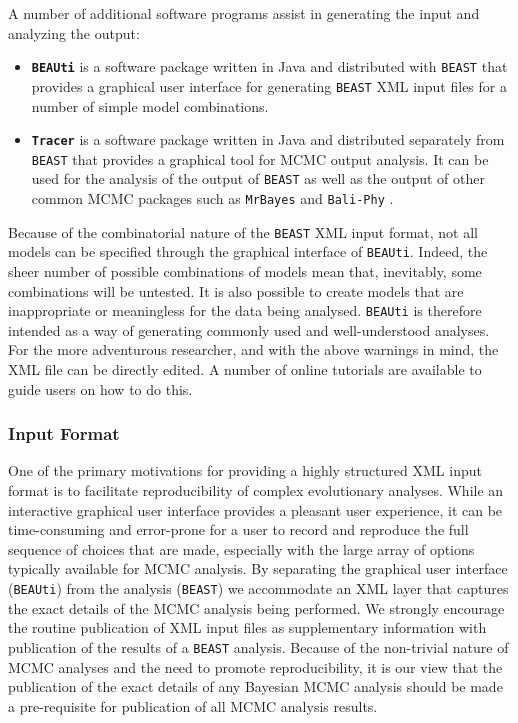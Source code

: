 \documentclass[cup7b, english]{cupbook}
\begin{document}
A number of additional software programs assist in generating the
input and analyzing the output:

\begin{itemize}
\item \textbf{\texttt{BEAUti}} is a software package written in Java and
distributed with \texttt{BEAST} that provides a graphical user interface for
generating \texttt{BEAST} XML input files for a number of simple model combinations.
\item \textbf{\texttt{Tracer}} is a software package written in Java and
distributed separately from \texttt{BEAST} that provides a graphical tool for
MCMC output analysis. It can be used for the analysis of the output
of \texttt{BEAST} as well as the output of other common MCMC packages such
as \texttt{MrBayes} \cite{HR2001} and \texttt{Bali-Phy} \cite{SR2006}.
\end{itemize}
Because of the combinatorial nature of the \texttt{BEAST} XML input format,
not all models can be specified through the graphical interface of
\texttt{BEAUti}. Indeed, the sheer number of possible combinations
of models mean that, inevitably, some combinations will
be untested. It is also possible to create models that
are inappropriate or meaningless for the data being analysed. \texttt{BEAUti}
is therefore intended as a way of generating commonly used and well-understood
analyses. For the more adventurous researcher, and with the above
warnings in mind, the XML file can be directly edited. A number of
online tutorials are available to guide users on how to do this.

\subsubsection{Input Format}

One of the primary motivations for providing a highly structured XML
input format is to facilitate reproducibility of complex evolutionary
analyses. While an interactive graphical user interface provides a
pleasant user experience, it can be time-consuming and error-prone
for a user to record and reproduce the full sequence of choices that
are made, especially with the large array of options typically available
for MCMC analysis. By separating the graphical user interface (\texttt{BEAUti})
from the analysis (\texttt{BEAST}) we accommodate an XML layer that captures
the exact details of the MCMC analysis being performed. We strongly
encourage the routine publication of XML input files as supplementary
information with publication of the results of a \texttt{BEAST} analysis. Because
of the non-trivial nature of MCMC analyses and the need to promote
reproducibility, it is our view that the publication of the exact
details of any Bayesian MCMC analysis should be made a pre-requisite
for publication of all MCMC analysis results.
\end{document}

